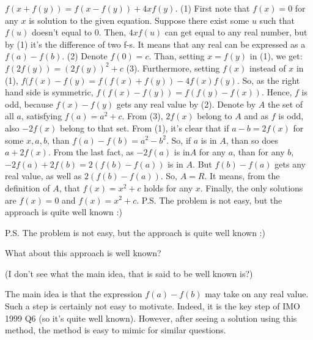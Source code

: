 \begin{solution}
	$f(x+f(y)) = f(x-f(y))+4xf(y) $. (1)
First note that $f(x)=0$ for any $x$ is solution to the given equation. Suppose there exist some $u$ such that $f(u)$ doesn't equal to $0$. Then, $4xf(u)$ can get equal to any real number, but by (1) it's the difference of two f-s. It means that any real can be expressed as a $f(a)-f(b)$. (2)
 Denote $f(0)=c$. Than, setting $x=f(y)$ in (1), we get: 
$f(2f(y))=(2f(y))^{2}+c $ (3).
Furthermore, setting $f(x)$ instead of $x$ in (1), $f(f(x)-f(y)=f(f(x)+f(y))-4f(x)f(y)$. So, as the right hand side is symmetric, $f(f(x)-f(y))=f(f(y)-f(x))$. Hence, $f$ is odd, because $f(x)-f(y)$ gets any real value by (2).
Denote by $A$ the set of all $a$, satisfying $f(a)=a^{2}+c$.
From (3), $2f(x)$ belong to $A$ and as $f$ is odd, also $-2f(x)$ belong to that set. 
From (1), it's clear that if $a-b=2f(x)$ for some $x,a,b$, than $f(a)-f(b)=a^{2}-b^{2}$. So, if $a$ is in $A$, than so does $a+2f(x)$. From the last fact, as $-2f(a)$ is in$A$ for any $a$, than for any $b$, $-2f(a)+2f(b)=2(f(b)-f(a))$ is in $A$. But $f(b)-f(a)$ gets any real value, as well as $2(f(b)-f(a))$. So, $A=R$. It means, from the definition of $A$, that $f(x)=x^{2}+c$ holds for any $x$. 
Finally, the only solutions are $f(x)=0$ and $f(x)=x^{2}+c$. 
P.S. The problem is not easy, but the approach is quite well known :)
\end{solution}



\begin{solution}
	\begin{tcolorbox}
P.S. The problem is not easy, but the approach is quite well known :)\end{tcolorbox}

What about this approach is well known?

(I don't see what the main idea, that is said to be well known is?)
\end{solution}



\begin{solution}
	The main idea is that the expression $f(a)-f(b)$ may take on any real value.
Such a step is certainly not easy to motivate. Indeed, it is the key step of IMO 1999 Q6 (so it's quite well known). However, after seeing a solution using this method, the method is easy to mimic for similar questions.
\end{solution}



